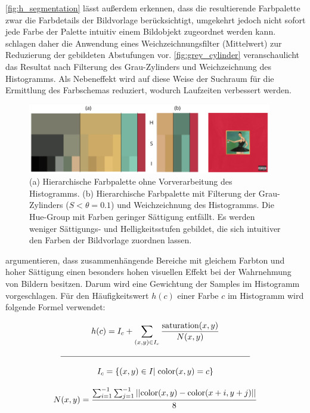 \autoref{fig:h_segmentation} lässt außerdem erkennen, dass die resultierende Farbpalette zwar die Farbdetails der Bildvorlage berücksichtigt, umgekehrt jedoch nicht sofort jede Farbe der Palette intuitiv einem Bildobjekt zugeordnet werden kann. \citet{image-based-schemes} schlagen daher die Anwendung eines Weichzeichnungsfilter (Mittelwert) zur Reduzierung der gebildeten Abstufungen vor. \autoref{fig:grey_cylinder} veranschaulicht das Resultat nach Filterung des Grau-Zylinders und Weichzeichnung des Histogramms. Als Nebeneffekt wird auf diese Weise der Suchraum für die Ermittlung des Farbschemas reduziert, wodurch Laufzeiten verbessert werden.

\begin{figure}[]
\centering
\includegraphics[width=0.95\textwidth]{img/grey_cylinder.png}
\caption{(a) Hierarchische Farbpalette ohne Vorverarbeitung des Histogramms. (b) Hierarchische Farbpalette mit Filterung der Grau-Zylinders ($S < \theta = 0.1$) und Weichzeichnung des Histogramms. Die Hue-Group mit Farben geringer Sättigung entfällt. Es werden weniger Sättigungs- und Helligkeitsstufen gebildet, die sich intuitiver den Farben der Bildvorlage zuordnen lassen.}
\label{fig:grey_cylinder}
\end{figure}

\citet{image-based-schemes} argumentieren, dass zusammenhängende Bereiche mit gleichem Farbton und hoher Sättigung einen besonders hohen visuellen Effekt bei der Wahrnehmung von Bildern besitzen. Darum wird eine Gewichtung der Samples im Histogramm vorgeschlagen. Für den Häufigkeitswert $h(c)$ einer Farbe $c$ im Histogramm wird folgende Formel verwendet:

\begin{equation}
\label{eq:weight}
\begin{gathered}
	h(c) = I_c + \sum_{(x, y) \in I_c} \frac{ \text{saturation}(x, y) }{ N(x, y) }\\
  \mathclap{\rule{8cm}{0.4pt}}\\[2mm] 
  I_c = \{ (x, y) \in I |\; \text{color}(x, y) = c\} \\[3mm] 
  N(x, y) = \frac{ \sum_{i=1}^{-1} \sum_{j=1}^{-1} ||\text{color}(x, y) - \text{color}(x+i, y+j)||}{8}
\end{gathered}
\end{equation}

